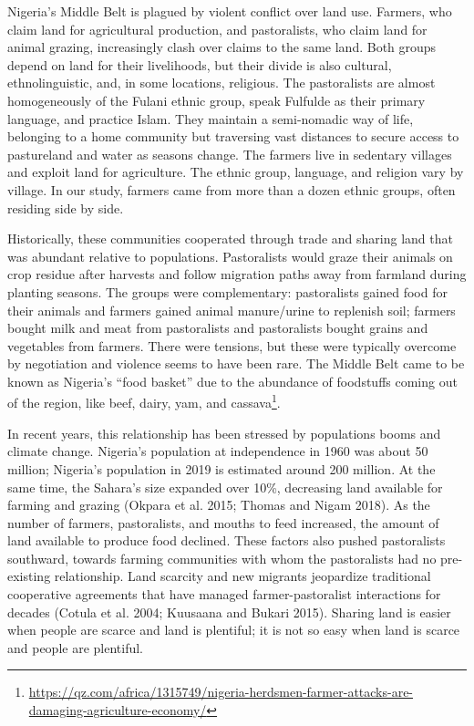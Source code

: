 \documentclass[11pt]{article}
\begin{document}
Nigeria's Middle Belt is plagued by violent conflict over land use.
Farmers, who claim land for agricultural production, and pastoralists,
who claim land for animal grazing, increasingly clash over claims to the
same land. Both groups depend on land for their livelihoods, but their
divide is also cultural, ethnolinguistic, and, in some locations,
religious. The pastoralists are almost homogeneously of the Fulani
ethnic group, speak Fulfulde as their primary language, and practice
Islam. They maintain a semi-nomadic way of life, belonging to a home
community but traversing vast distances to secure access to pastureland
and water as seasons change. The farmers live in sedentary villages and
exploit land for agriculture. The ethnic group, language, and religion
vary by village. In our study, farmers came from more than a dozen
ethnic groups, often residing side by side.

Historically, these communities cooperated through trade and sharing
land that was abundant relative to populations. Pastoralists would graze
their animals on crop residue after harvests and follow migration paths
away from farmland during planting seasons. The groups were
complementary: pastoralists gained food for their animals and farmers
gained animal manure/urine to replenish soil; farmers bought milk and
meat from pastoralists and pastoralists bought grains and vegetables
from farmers. There were tensions, but these were typically overcome by
negotiation and violence seems to have been rare. The Middle Belt came
to be known as Nigeria's ``food basket'' due to the abundance of
foodstuffs coming out of the region, like beef, dairy, yam, and
cassava\footnote{\url{https://qz.com/africa/1315749/nigeria-herdsmen-farmer-attacks-are-damaging-agriculture-economy/}}.

In recent years, this relationship has been stressed by populations
booms and climate change. Nigeria's population at independence in 1960
was about 50 million; Nigeria's population in 2019 is estimated around
200 million. At the same time, the Sahara's size expanded over 10\%,
decreasing land available for farming and grazing (Okpara et al. 2015;
Thomas and Nigam 2018). As the number of farmers, pastoralists, and
mouths to feed increased, the amount of land available to produce food
declined. These factors also pushed pastoralists southward, towards
farming communities with whom the pastoralists had no pre-existing
relationship. Land scarcity and new migrants jeopardize traditional
cooperative agreements that have managed farmer-pastoralist interactions
for decades (Cotula et al. 2004; Kuusaana and Bukari 2015). Sharing land
is easier when people are scarce and land is plentiful; it is not so
easy when land is scarce and people are plentiful.
\end{document}
